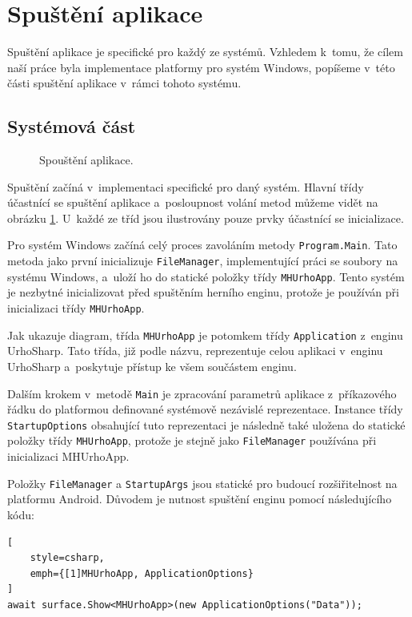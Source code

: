 \section{Spuštění aplikace}
\label{sec:init}
Spuštění aplikace je specifické pro každý ze systémů. Vzhledem k~tomu, že cílem naší práce byla implementace platformy pro systém Windows, popíšeme v~této části spuštění aplikace v~rámci tohoto systému.

\subsection{Systémová část}

\begin{figure}[h]
	\centering
	\fontsize{8pt}{11pt}\selectfont
	\def\svgwidth{\textwidth}
	
	\caption{Spouštění aplikace.}
	\label{fig:startup}
\end{figure}

Spuštění začíná v~implementaci specifické pro daný systém. Hlavní třídy účastnící se spuštění aplikace a~posloupnost volání metod můžeme vidět na obrázku \ref{fig:startup}. U~každé ze tříd jsou ilustrovány pouze prvky účastnící se inicializace. 

Pro systém Windows začíná celý proces zavoláním metody \texttt{Program.Main}. Tato metoda jako první inicializuje \texttt{FileManager}, implementující práci se soubory na systému Windows, a~uloží ho do statické položky třídy \texttt{MHUrhoApp}. Tento systém je nezbytné inicializovat před spuštěním herního enginu, protože je používán při inicializaci třídy \texttt{MHUrhoApp}.

Jak ukazuje diagram, třída \texttt{MHUrhoApp} je potomkem třídy \texttt{Application} z~enginu UrhoSharp. Tato třída, již podle názvu, reprezentuje celou aplikaci v~enginu UrhoSharp a~poskytuje přístup ke všem součástem enginu. 

Dalším krokem v~metodě \texttt{Main} je zpracování parametrů aplikace z~příkazového řádku do platformou definované systémově nezávislé reprezentace. Instance třídy \texttt{StartupOptions} obsahující tuto reprezentaci je následně také uložena do statické položky třídy \texttt{MHUrhoApp}, protože je stejně jako \texttt{FileManager} používána při inicializaci MHUrhoApp.

Položky \texttt{FileManager} a \texttt{StartupArgs} jsou statické pro budoucí rozšiřitelnost na platformu Android.
Důvodem je nutnost spuštění enginu pomocí následujícího kódu:

\begin{lstlisting}[
	style=csharp,
	emph={[1]MHUrhoApp, ApplicationOptions}
]
await surface.Show<MHUrhoApp>(new ApplicationOptions("Data"));
\end{lstlisting}

